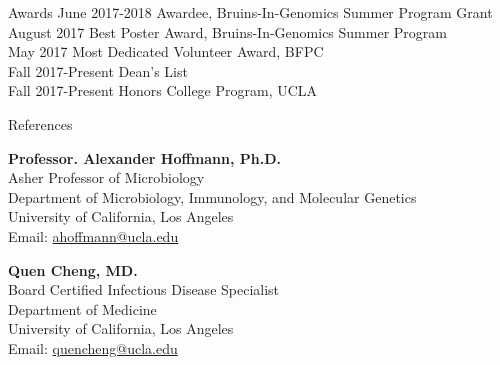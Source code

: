 \documentclass{resume} %
\begin{document}
\begin{rSection}{Awards}
June 2017-2018 \hspace{3em} Awardee, Bruins-In-Genomics Summer Program Grant\\
August 2017 \hspace{4.3em} Best Poster Award, Bruins-In-Genomics Summer Program \\
May 2017 \hspace{5.5em} Most Dedicated Volunteer Award, BFPC \\
Fall 2017-Present \hspace{2.2em} Dean's List \\
Fall 2017-Present \hspace{2.2em} Honors College Program, UCLA\\
\end{rSection}





\begin{rSection}{References}
\end{rSection}


\vspace{-1em} 
\textbf{Professor. Alexander Hoffmann, Ph.D.} \\
Asher Professor of Microbiology  \\
Department of Microbiology, Immunology, and Molecular Genetics \\
University of California, Los Angeles \\
Email: \href{mailto:ahoffmann@ucla.edu}{ahoffmann@ucla.edu} 

\vspace{1em} 

\textbf{Quen Cheng, MD.} \\
Board Certified Infectious Disease Specialist \\
Department of Medicine \\
University of California, Los Angeles \\
Email: \href{mailto:quencheng@ucla.edu}{quencheng@ucla.edu} 


\end{document}
